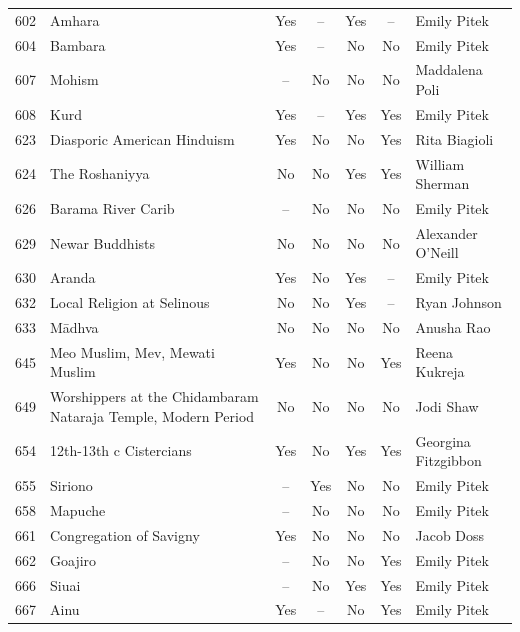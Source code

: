 {\begin{longtable}{rp{3.5cm}ccccp{3cm}}
602 & {\raggedright Amhara} & Yes & -- & Yes & -- & {\raggedright Emily Pitek} \\
604 & {\raggedright Bambara} & Yes & -- & No & No & {\raggedright Emily Pitek} \\
607 & {\raggedright Mohism} & -- & No & No & No & {\raggedright Maddalena Poli} \\
608 & {\raggedright Kurd} & Yes & -- & Yes & Yes & {\raggedright Emily Pitek} \\
623 & {\raggedright Diasporic American Hinduism} & Yes & No & No & Yes & {\raggedright Rita Biagioli} \\
624 & {\raggedright The Roshaniyya} & No & No & Yes & Yes & {\raggedright William Sherman} \\
626 & {\raggedright Barama River Carib} & -- & No & No & No & {\raggedright Emily Pitek} \\
629 & {\raggedright Newar Buddhists} & No & No & No & No & {\raggedright Alexander O’Neill} \\
630 & {\raggedright Aranda} & Yes & No & Yes & -- & {\raggedright Emily Pitek} \\
632 & {\raggedright Local Religion at Selinous} & No & No & Yes & -- & {\raggedright Ryan Johnson} \\
633 & {\raggedright Mādhva} & No & No & No & No & {\raggedright Anusha Rao} \\
645 & {\raggedright Meo Muslim, Mev, Mewati Muslim} & Yes & No & No & Yes & {\raggedright Reena Kukreja} \\
649 & {\raggedright Worshippers at the Chidambaram Nataraja Temple, Modern Period} & No & No & No & No & {\raggedright Jodi Shaw} \\
654 & {\raggedright 12th-13th c Cistercians} & Yes & No & Yes & Yes & {\raggedright Georgina Fitzgibbon} \\
655 & {\raggedright Siriono} & -- & Yes & No & No & {\raggedright Emily Pitek} \\
658 & {\raggedright Mapuche} & -- & No & No & No & {\raggedright Emily Pitek} \\
661 & {\raggedright Congregation of Savigny} & Yes & No & No & No & {\raggedright Jacob Doss} \\
662 & {\raggedright Goajiro} & -- & No & No & Yes & {\raggedright Emily Pitek} \\
666 & {\raggedright Siuai} & -- & No & Yes & Yes & {\raggedright Emily Pitek} \\
667 & {\raggedright Ainu} & Yes & -- & No & Yes & {\raggedright Emily Pitek} \\

\end{longtable}}
